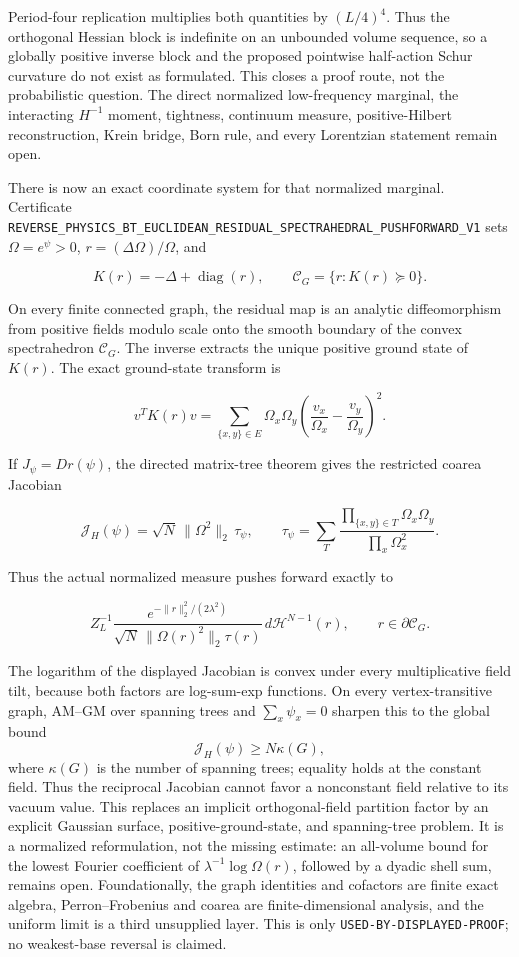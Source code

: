 \documentclass[11pt]{article}
\theoremstyle{definition}
\theoremstyle{remark}
\newcommand{\cert}[1]{\nolinkurl{#1}}
\newcommand{\rtype}[1]{\nolinkurl{#1}}
\begin{document}
Period-four replication multiplies both quantities by \((L/4)^4\).  Thus the
orthogonal Hessian block is indefinite on an unbounded volume sequence, so a
globally positive inverse block and the proposed pointwise half-action Schur
curvature do not exist as formulated.  This closes a proof route, not the
probabilistic question.  The direct normalized low-frequency marginal, the
interacting \(H^{-1}\) moment, tightness, continuum measure, positive-Hilbert
reconstruction, Krein bridge, Born rule, and every Lorentzian statement remain
open.

There is now an exact coordinate system for that normalized marginal.
Certificate
\cert{REVERSE_PHYSICS_BT_EUCLIDEAN_RESIDUAL_SPECTRAHEDRAL_PUSHFORWARD_V1}
sets \(\Omega=e^\psi>0\), \(r=(\Delta\Omega)/\Omega\), and

\[
 K(r)=-\Delta+\operatorname{diag}(r),\qquad
 \mathcal C_G=\{r:K(r)\succeq0\}.
\]

On every finite connected graph, the residual map is an analytic
diffeomorphism from positive fields modulo scale onto the smooth boundary of
the convex spectrahedron \(\mathcal C_G\).  The inverse extracts the unique
positive ground state of \(K(r)\).  The exact ground-state transform is

\[
 v^TK(r)v=\sum_{\{x,y\}\in E}\Omega_x\Omega_y
 \left(\frac{v_x}{\Omega_x}-\frac{v_y}{\Omega_y}\right)^2.
\]

If \(J_\psi=Dr(\psi)\), the directed matrix-tree theorem gives the
restricted coarea Jacobian

\[
 \mathcal J_H(\psi)=\sqrt N\,\|\Omega^2\|_2\,\tau_\psi,
 \qquad
 \tau_\psi=\sum_T
 \frac{\prod_{\{x,y\}\in T}\Omega_x\Omega_y}
      {\prod_x\Omega_x^2}.
\]

Thus the actual normalized measure pushes forward exactly to

\[
 Z_L^{-1}\frac{e^{-\|r\|_2^2/(2\lambda^2)}}
 {\sqrt N\,\|\Omega(r)^2\|_2\tau(r)}
 \,d\mathcal H^{N-1}(r),
 \qquad r\in\partial\mathcal C_G.
\]

The logarithm of the displayed Jacobian is convex under every multiplicative
field tilt, because both factors are log-sum-exp functions.  On every
vertex-transitive graph, AM--GM over spanning trees and
\(\sum_x\psi_x=0\) sharpen this to the global bound
\[
                   \mathcal J_H(\psi)\geq N\kappa(G),
\]
where \(\kappa(G)\) is the number of spanning trees; equality holds at the
constant field.  Thus the reciprocal Jacobian cannot favor a nonconstant
field relative to its vacuum value.  This replaces an
implicit orthogonal-field partition factor by an explicit Gaussian surface,
positive-ground-state, and spanning-tree problem.  It is a normalized
reformulation, not the missing estimate: an all-volume bound for the lowest
Fourier coefficient of \(\lambda^{-1}\log\Omega(r)\), followed by a dyadic
shell sum, remains open.  Foundationally, the graph identities and cofactors
are finite exact algebra, Perron--Frobenius and coarea are finite-dimensional
analysis, and the uniform limit is a third unsupplied layer.  This is only
\rtype{USED-BY-DISPLAYED-PROOF}; no weakest-base reversal is claimed.
\end{document}
